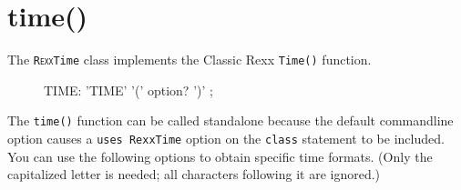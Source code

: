 \section{time()}\label{refrexxtime}
 
The \texttt{R\textsc{exx}Time} class implements the Classic Rexx \texttt{Time()} function.
\begin{figure}[h]
   \begin{shaded}
\begin{rail}
  TIME:  'TIME' '('   option?  ')'
  ;
\end{rail}
 \end{shaded}
\end{figure}

The \texttt{time()} function can be called standalone because the
default   commandline option causes a \texttt{uses
  RexxTime} option on the \texttt{class} statement to be included. You can use the following options to obtain specific time formats. (Only the capitalized letter is needed; all characters following it are ignored.)
